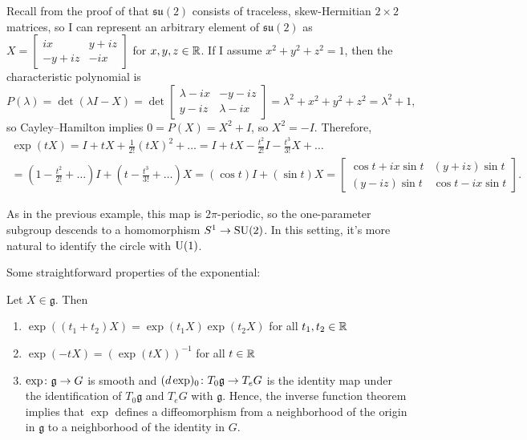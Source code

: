 \begin{example}\label{ex:exp on su2}
	Recall from the proof of  that $\mathfrak{su}(2)$ consists of traceless, skew-Hermitian $2 \times 2$ matrices, so I can represent an arbitrary element of $\mathfrak{su}(2)$ as $X=\begin{bmatrix} ix & y + iz \\ -y+iz & -ix \end{bmatrix}$ for $x,y,z \in\mathbb{R}$. If I assume $x^2 + y^2 + z^2 = 1$, then the characteristic polynomial is
	\[
		P(\lambda) = \det(\lambda I - X) = \det \begin{bmatrix} \lambda-ix & -y - iz \\ y-iz & \lambda-ix \end{bmatrix} = \lambda^2 + x^2+y^2+z^2 = \lambda^2 + 1,
	\]
	so Cayley–Hamilton implies $0 = P(X) = X^2 + I$, so $X^2 = -I$. Therefore,
	\begin{multline*}
		\exp(tX) = I + tX + \frac{1}{2!}(tX)^2 + \dots = I + tX - \frac{t^2}{2!}I - \frac{t^3}{3!} X + \dots \\
		= \left(1-\frac{t^2}{2!} + \dots \right) I + \left( t - \frac{t^3}{3!} + \dots \right)X = (\cos t) I + (\sin t) X = \begin{bmatrix} \cos t +i x \sin t & (y+iz)\sin t \\ (y-iz)\sin t &  \cos t - i x\sin t\end{bmatrix}.
	\end{multline*}
	
	As in the previous example, this map is $2\pi$-periodic, so the one-parameter subgroup descends to a homomorphism $S^1 \to \operatorname{SU}(2)$. In this setting, it's more natural to identify the circle with $\operatorname{U}(1)$.
\end{example}

Some straightforward properties of the exponential:

\begin{proposition}\label{prop:exponential properties}
	Let $X \in \mathfrak{g}$. Then
	\begin{enumerate}
		\item $\exp((t_1 + t_2)X) = \exp(t_1 X) \exp(t_2 X)$ for all $t_1,t_2 \in \mathbb{R}$
		\item $\exp(-tX) = (\exp(tX))^{-1}$ for all $t \in \mathbb{R}$
		\item $\exp \colon\thinspace\! \mathfrak{g} \to G$ is smooth and $(d\exp)_0 \colon\thinspace\! T_0 \mathfrak{g} \to T_eG$ is the identity map under the identification of $T_0 \mathfrak{g}$ and $T_eG$ with $\mathfrak{g}$. Hence, the inverse function theorem implies that $\exp$ defines a diffeomorphism from a neighborhood of the origin in $\mathfrak{g}$ to a neighborhood of the identity in $G$.
	\end{enumerate}
\end{proposition}

